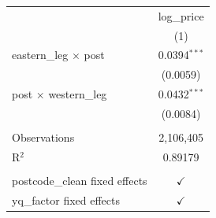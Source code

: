    \begin{tabular}{lc}
      \toprule
                                     & log\_price\\   
                                     & (1)\\  
      \midrule 
      eastern\_leg $\times$ post     & 0.0394$^{***}$\\   
                                     & (0.0059)\\   
      post $\times$ western\_leg     & 0.0432$^{***}$\\   
                                     & (0.0084)\\   
       \\
      Observations                   & 2,106,405\\  
      R$^2$                          & 0.89179\\  
       \\
      postcode\_clean fixed effects  & $\checkmark$\\   
      yq\_factor fixed effects       & $\checkmark$\\   
      \bottomrule
   \end{tabular}
